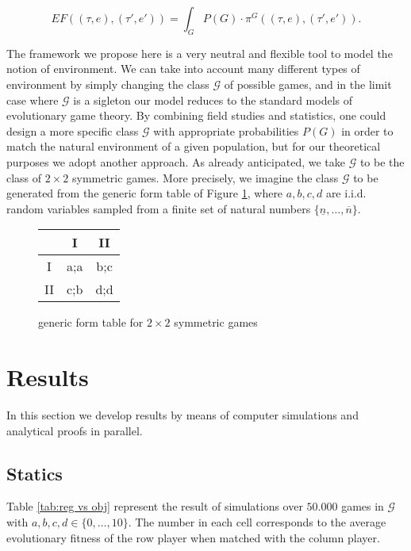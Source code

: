 \documentclass[fleqn,reqno,11pt]{article}
\begin{document}
$$ EF((\tau,e),(\tau',e'))= \int_G  P(G) \cdot \pi^G((\tau, e),(\tau', e')).  $$

\noindent The framework we propose here is a very neutral and flexible tool to model the notion of environment. We can take into account many different types of environment by simply changing the class $\mathcal{G}$ of possible games, and in the limit case where $\mathcal{G}$ is a sigleton our model reduces to the standard models of evolutionary game theory. 
By combining field studies and statistics, one could design a more specific class $\mathcal{G}$ with appropriate probabilities $P(G)$ in order to match the natural environment of a given population, but for our theoretical purposes we adopt another approach. As already anticipated, we take $\mathcal{G}$ to be the class of $2 \times 2$ symmetric games. More precisely, we imagine the class $\mathcal{G}$ to be generated from the generic form table of Figure \ref{generic form table}, where $a,b,c,d$ are i.i.d. random variables sampled from a finite set of natural numbers $ \lbrace \underline{n}, \dots, \overline{n}  \rbrace$.


\begin{figure}
\begin{center}%
\begin{tabular}{|c|c|c|}
\hline 
 & I & II\tabularnewline
\hline 
\hline 
I & a;a & b;c\tabularnewline
\hline 
II & c;b & d;d\tabularnewline
\hline 
\end{tabular}\end{center}

\protect\caption{generic form table for $2 \times 2$ symmetric games}
\label{generic form table}
\end{figure}






\section{Results}

In this section we develop results by means of computer simulations and analytical proofs in parallel. 

\subsection{Statics}

Table \ref{tab:reg vs obj} represent the result of simulations over $50.000$ games in $\mathcal{G}$ with $a,b,c,d \in \lbrace  0, \dots, 10 \rbrace$. The number in each cell corresponds to the average evolutionary fitness of the row player when matched with the column player. 
\end{document}
